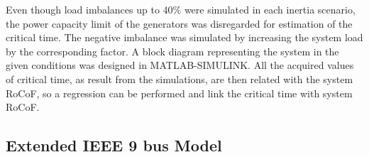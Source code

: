 Even though load imbalances up to 40\% were simulated in each inertia scenario, the power capacity limit of the generators was disregarded for estimation of the critical time. The negative imbalance was simulated by increasing the system load by the corresponding factor. A block diagram representing the system in the given conditions was designed in MATLAB-SIMULINK. %
All the acquired values of critical time, as result from the simulations, are then related with the system RoCoF, so a regression can be performed and link the critical time with system RoCoF.

\subsection{Extended IEEE 9 bus Model}

